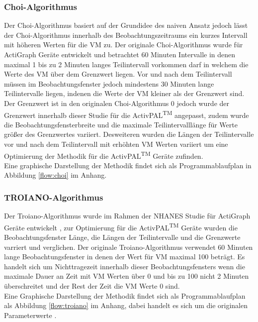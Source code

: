 \subsubsection{Choi-Algorithmus}
Der Choi-Algorithmus basiert auf der Grundidee des naiven Ansatz jedoch lässt der Choi-Algorithmus innerhalb des Beobachtungszeitraums ein kurzes Intervall mit höheren Werten für die \ac{VM} zu. Der originale Choi-Algorithmus\cite{Choi2011} wurde für ActiGraph Geräte entwickelt und betrachtet 60 Minuten Intervalle in denen maximal 1 bis zu 2 Minuten langes Teilintervall vorkommen darf in welchem die Werte des \ac{VM} über dem Grenzwert liegen. Vor und nach dem Teilintervall müssen im Beobachtungsfenster jedoch mindestens 30 Minuten lange Teilintervalle liegen, indenen die Werte der \ac{VM} kleiner als der Grenzwert sind. Der Grenzwert ist in den originalen Choi-Algorithmus 0 \cite{Choi2011} jedoch wurde der Grenzwert innerhalb dieser Studie für die ActivPAL\textsuperscript{TM} angepasst, zudem wurde die Beobachtungsfensterbreite und die maximale Teilintervalllänge für Werte größer des Grenzwertes variiert. Desweiteren wurden die Längen der Teilintervalle vor und nach dem Teilintervall mit erhöhten \ac{VM} Werten variiert um eine Optimierung der Methodik für die ActivPAL\textsuperscript{TM} Geräte zufinden.\\
Eine graphische Darstellung der Methodik findet sich als Programmablaufplan in Abbildung \ref{flow:choi} im Anhang.



\subsubsection{TROIANO-Algorithmus}
Der Troiano-Algorithmus wurde im Rahmen der NHANES Studie für ActiGraph Geräte entwickelt \cite{TROIANO2008}, zur Optimierung für die ActivPAL\textsuperscript{TM} Geräte wurden die Beobachtungsfenster Länge, die Längen der Teilintervalle und die Grenzwerte varriert und verglichen. Der originale Troiano-Algorithmus verwendet 60 Minuten lange Beobachtungsfenster in denen der Wert für \ac{VM} maximal 100 beträgt. Es handelt sich um Nichttragezeit innerhalb dieser Beobachtungsfensters wenn die maximale Dauer an Zeit mit \ac{VM} Werten  über 0 und bis zu 100 nicht 2 Minuten überschreitet und der Rest der Zeit die \ac{VM} Werte 0 sind. \\
Eine Graphische Darstellung der Methodik findet sich als Programmablaufplan als Abbildung \ref{flow:troiano} im Anhang, dabei handelt es sich um die originalen Parameterwerte \cite{TROIANO2008}.



